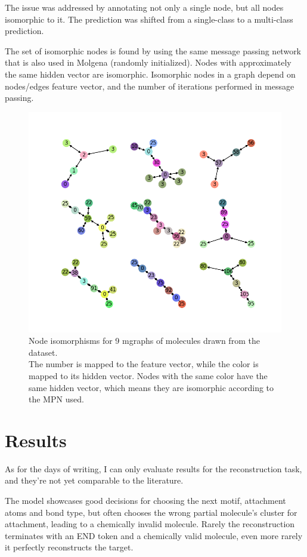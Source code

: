 \documentclass{article}
\begin{document}
The issue was addressed by annotating not only a single node, but all nodes isomorphic to it.
The prediction was shifted from a single-class to a multi-class prediction.

The set of isomorphic nodes is found by using the same message passing network that is also used in Molgena (randomly initialized).
Nodes with approximately the same hidden vector are isomorphic.
Isomorphic nodes in a graph depend on nodes/edges feature vector, and the number of iterations performed in message passing.

\begin{figure}[h]
\centering
\includegraphics[width=1.2\linewidth]{./img/nodeisomorphisms}
\caption{
Node isomorphisms for 9 mgraphs of molecules drawn from the dataset.\\
The number is mapped to the feature vector, while the color is mapped to its hidden vector.
Nodes with the same color have the same hidden vector, which means they are isomorphic according to the MPN used.
}
\end{figure}

\section{Results}

As for the days of writing, I can only evaluate results for the reconstruction task, and they're not yet comparable to the literature.

The model showcases good decisions for choosing the next motif, attachment atoms and bond type, but often chooses the wrong partial molecule's cluster for attachment,
leading to a chemically invalid molecule.
Rarely the reconstruction terminates with an END token and a chemically valid molecule, even more rarely it perfectly reconstructs the target.
\end{document}
